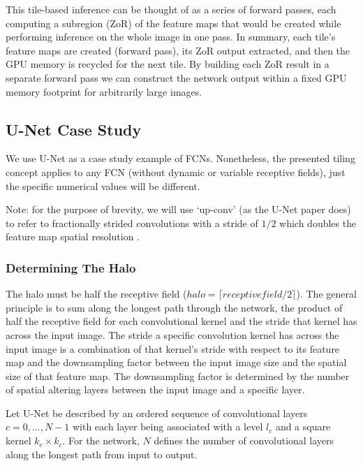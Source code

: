 \documentclass[10pt, indentfirst]{article}
\begin{document}
This tile-based inference can be thought of as a series of forward passes, each computing a subregion (ZoR) of the feature maps that would be created while performing inference on the whole image in one pass. 
In summary, each tile's feature maps are created (forward pass), its ZoR output extracted, and then the GPU memory is recycled for the next tile. By building each ZoR result in a separate forward pass we can construct the network output within a fixed GPU memory footprint for arbitrarily large images. 

\subsection{U-Net Case Study}

We use U-Net \citep{Ronneberger2015a} as a case study example of FCNs. Nonetheless, the presented tiling concept applies to any FCN (without dynamic or variable receptive fields), just the specific numerical values will be different. 

Note: for the purpose of brevity, we will use `up-conv' (as the U-Net paper does) to refer to fractionally strided convolutions with a stride of $1/2$ which doubles the feature map spatial resolution \citep{Dumoulin2018}.

\subsubsection{Determining The Halo}

The halo must be half the receptive field ($halo = \lceil receptive field / 2 \rceil$). 
The general principle is to sum along the longest path through the network, the product of half the receptive field for each convolutional kernel and the stride that kernel has across the input image. The stride a specific convolution kernel has across the input image is a combination of that kernel's stride with respect to its feature map and the downsampling factor between the input image size and the spatial size of that feature map. The downsampling factor is determined by the number of spatial altering layers between the input image and a specific layer. 

Let U-Net be described by an ordered sequence of convolutional layers $c={0, ..., N-1}$ with each layer being associated with a level $l_{c}$ and a square kernel $k_{c} \times k_{c}$. 
For the network, $N$ defines the number of convolutional layers along the longest path from input to output. 
\end{document}
